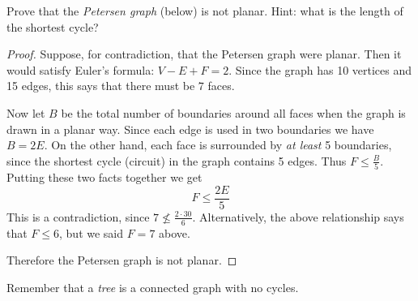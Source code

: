 \documentclass[10pt]{exam}
\def\vertexsize{4pt}
\newcommand{\vtx}[2]{node[fill,circle,inner sep=0pt, minimum size=\vertexsize,label=#1:#2]{}}
\renewcommand{\v}{\vtx{above}{}}
\begin{document}
\begin{questions}
\question[6] Prove that the {\em Petersen graph} (below) is not planar.  Hint: what is the length of the shortest cycle?

\begin{center}
\end{center}

\begin{solution}
  \begin{proof}
    Suppose, for contradiction, that the Petersen graph were planar.  Then it would satisfy Euler's formula: $V - E + F = 2$.  Since the graph has 10 vertices and 15 edges, this says that there must be $7$ faces.  
    
    Now let $B$ be the total number of boundaries around all faces when the graph is drawn in a planar way.  Since each edge is used in two boundaries we have $B = 2E$.  On the other hand, each face is surrounded by {\em at least} 5 boundaries, since the shortest cycle (circuit) in the graph contains 5 edges.  Thus $F \le \frac{B}{5}$.  Putting these two facts together we get
    \[F \le \frac{2E}{5}\]
    This is a contradiction, since $7 \not\le \frac{2\cdot 30}{6}$.  Alternatively, the above relationship says that $F \le 6$, but we said $F = 7$ above.
    
    Therefore the Petersen graph is not planar.
  \end{proof}

\end{solution}


\question[9] Remember that a {\em tree} is a connected graph with no cycles.
\end{questions}
\end{document}
